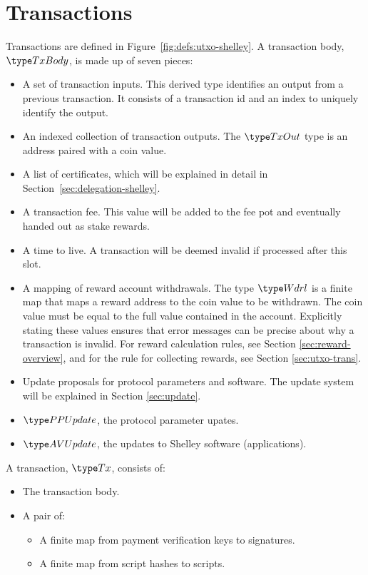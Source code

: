 \section{Transactions}
\label{sec:transactions}

Transactions are defined in Figure~\ref{fig:defs:utxo-shelley}.
A transaction body, $\TxBody$, is made up of seven pieces:

\begin{itemize}
  \item A set of transaction inputs.
    This derived type identifies an output from a previous transaction.
    It consists of a transaction id and an index to uniquely identify the output.
  \item An indexed collection of transaction outputs.
    The $\TxOut$ type is an address paired with a coin value.
  \item A list of certificates, which will be explained in detail in
    Section~\ref{sec:delegation-shelley}.
  \item A transaction fee. This value will be added to the fee pot and eventually handed out
    as stake rewards.
  \item A time to live. A transaction will be deemed invalid if processed after this slot.
  \item A mapping of reward account withdrawals.  The type $\Wdrl$ is a finite map that maps
    a reward address to the coin value to be withdrawn. The coin value must be equal
    to the full value contained in the account. Explicitly stating these values ensures
    that error messages can be precise about why a transaction is invalid.
    For reward calculation rules, see Section \ref{sec:reward-overview},
    and for the rule for collecting rewards, see Section \ref{sec:utxo-trans}.
  \item Update proposals for protocol parameters and software.
    The update system will be explained in Section \ref{sec:update}.
  \item $\PPUpdate$, the protocol parameter upates.
  \item $\AVUpdate$, the updates to Shelley software (applications).
\end{itemize}

A transaction, $\Tx$, consists of:

\begin{itemize}
  \item The transaction body.
  \item A pair of:
    \begin{itemize}
      \item A finite map from payment verification keys to signatures.
      \item A finite map from script hashes to scripts.
    \end{itemize}
\end{itemize}

